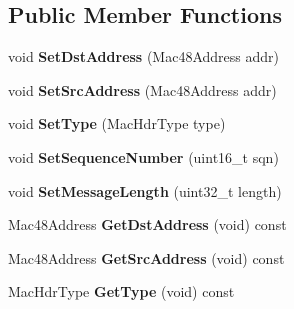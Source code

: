 \subsection*{\-Public \-Member \-Functions}
\begin{DoxyCompactItemize}
\item 
\hypertarget{classns3_1_1PLC__MacHeader_a9909a9ef5ceb64272b26698a4f43e570}{void {\bfseries \-Set\-Dst\-Address} (\-Mac48\-Address addr)}\label{classns3_1_1PLC__MacHeader_a9909a9ef5ceb64272b26698a4f43e570}

\item 
\hypertarget{classns3_1_1PLC__MacHeader_a09b3bc12fe4c53bddb404d119bec2eed}{void {\bfseries \-Set\-Src\-Address} (\-Mac48\-Address addr)}\label{classns3_1_1PLC__MacHeader_a09b3bc12fe4c53bddb404d119bec2eed}

\item 
\hypertarget{classns3_1_1PLC__MacHeader_aed0d3d4dd61ad31040d13bb390490fe2}{void {\bfseries \-Set\-Type} (\-Mac\-Hdr\-Type type)}\label{classns3_1_1PLC__MacHeader_aed0d3d4dd61ad31040d13bb390490fe2}

\item 
\hypertarget{classns3_1_1PLC__MacHeader_a9a6b66b4fd7eeeb7b95dc5acb86e8def}{void {\bfseries \-Set\-Sequence\-Number} (uint16\-\_\-t sqn)}\label{classns3_1_1PLC__MacHeader_a9a6b66b4fd7eeeb7b95dc5acb86e8def}

\item 
\hypertarget{classns3_1_1PLC__MacHeader_aaddd36d8283afb0c55c40c2a014824a2}{void {\bfseries \-Set\-Message\-Length} (uint32\-\_\-t length)}\label{classns3_1_1PLC__MacHeader_aaddd36d8283afb0c55c40c2a014824a2}

\item 
\hypertarget{classns3_1_1PLC__MacHeader_a9623b9de1d0ec7622871ecfb648f5b89}{\-Mac48\-Address {\bfseries \-Get\-Dst\-Address} (void) const }\label{classns3_1_1PLC__MacHeader_a9623b9de1d0ec7622871ecfb648f5b89}

\item 
\hypertarget{classns3_1_1PLC__MacHeader_a6b722979705cc77250da3b8dced18de2}{\-Mac48\-Address {\bfseries \-Get\-Src\-Address} (void) const }\label{classns3_1_1PLC__MacHeader_a6b722979705cc77250da3b8dced18de2}

\item 
\hypertarget{classns3_1_1PLC__MacHeader_a2dfb30c968e85dd79d3930bc7ba07fa5}{\-Mac\-Hdr\-Type {\bfseries \-Get\-Type} (void) const }\label{classns3_1_1PLC__MacHeader_a2dfb30c968e85dd79d3930bc7ba07fa5}


\end{DoxyCompactItemize}
